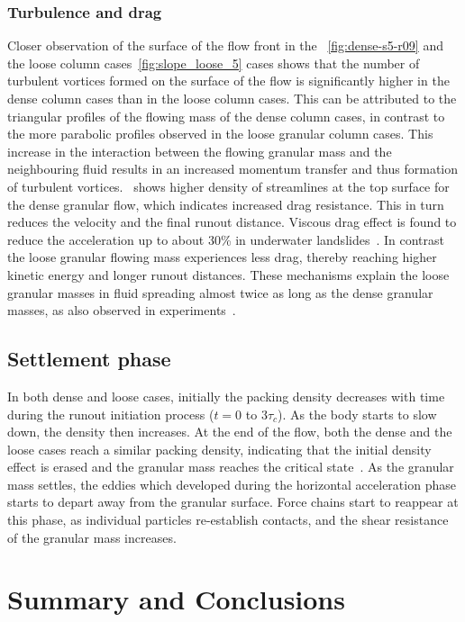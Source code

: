 \documentclass[12pt,twoside]{tuhhproc-en}
\begin{document}
\subsubsection{Turbulence and drag}
Closer observation of the surface of the flow front in the ~\cref{fig:dense-s5-r09} and the loose column cases~\cref{fig:slope_loose_5} cases shows that the number of turbulent vortices formed on the surface of the flow is significantly higher in the dense column cases than in the loose column cases. This can be attributed to the triangular profiles of the flowing mass of the dense column cases, in contrast to the more parabolic profiles observed in the loose granular column cases. This increase in the interaction between the flowing granular mass and the neighbouring fluid results in an increased momentum transfer and thus formation of turbulent vortices.~ shows higher density of streamlines at the top surface for the dense granular flow, which indicates increased drag resistance. This in turn reduces the velocity and the final runout distance. Viscous drag effect is found to reduce the acceleration up to about 30\% in underwater landslides~\citep{Watts2000}. In contrast the loose granular flowing mass experiences less drag, thereby reaching higher kinetic energy and longer runout distances. These mechanisms explain the loose granular masses in fluid spreading almost twice as long as the dense granular masses, as also observed in experiments~\citep{Iverson2000, Schaeffer2008}. 

\subsection{Settlement phase}
In both dense and loose cases, initially the packing density decreases with time during the runout initiation process ($t = 0$ to $3\tau_c$). As the body starts to slow down, the density then increases. At the end of the flow, both the dense and the loose cases reach a similar packing density, indicating that the initial density effect is erased and the granular mass reaches the critical state~\citep{Schofield1968}. As the granular mass settles, the eddies which developed during the horizontal acceleration phase starts to depart away from the granular surface. Force chains start to reappear at this phase, as individual particles re-establish contacts, and the shear resistance of the granular mass increases.


\section{Summary and Conclusions}
\end{document}

